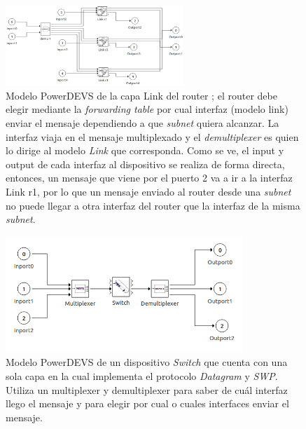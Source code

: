 \documentclass[10pt,a4paper]{article}
\begin{document}
\newpage

\begin{figure}[!htb]
    \centering
    \includegraphics[width = 0.6\textwidth]{img/png/powerdevs/router_interfaces.png}
    \caption{Modelo PowerDEVS de la capa Link del router ; el router debe elegir mediante la \textit{forwarding table} por cual interfaz (modelo link) enviar el mensaje dependiendo a que \textit{subnet} quiera alcanzar. La interfaz viaja en el mensaje multiplexado y el \textit{demultiplexer} es quien lo dirige al modelo \textit{Link} que corresponda. Como se ve, el input y output de cada interfaz al dispositivo se realiza de forma directa, entonces, un mensaje que viene por el puerto 2 va a ir a la interfaz Link r1, por lo que un mensaje enviado al router desde una \textit{subnet} no puede llegar a otra interfaz del router que la interfaz de la misma \textit{subnet}.}
    \label{figure: powerdevs interfaces}
\end{figure}

\begin{figure}[!htb]
    \centering
    \includegraphics[width = 0.8\textwidth]{img/png/powerdevs/switch.png}
    \caption{Modelo PowerDEVS de un dispositivo \textit{Switch} que cuenta con una sola capa en la cual implementa el protocolo \textit{Datagram} y \textit{SWP}. Utiliza un multiplexer y demultiplexer para saber de cuál interfaz llego el mensaje y para elegir por cual o cuales interfaces enviar el mensaje.}
    \label{figure: powerdevs switch}
\end{figure}
\end{document}
